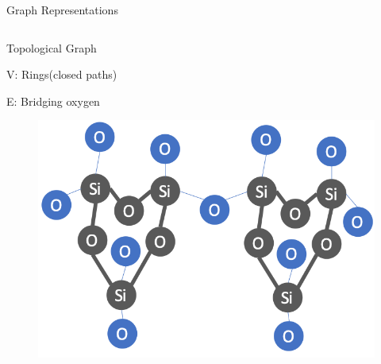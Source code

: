 \begin{frame}[t]{Graph Representations}
\begin{columns}[t]
   \begin{block}{Topological Graph}
   \begin{itemize}
   \begin{footnotesize}
       \item V: Rings(closed paths)
       \item E: Bridging oxygen
    \end{footnotesize}
   \end{itemize}
    \begin{figure}
	    \centering
        \includegraphics[width=.5\textwidth]{images/ring.png}
	\end{figure}   
   
   
   \end{block}
   
 \end{columns}
\end{frame}

